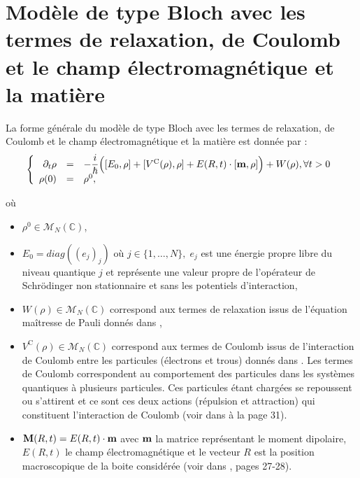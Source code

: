 \documentclass[a4paper,12pt]{article} %
\begin{document}

\tableofcontents

\bigskip



\section{Modèle de type Bloch avec les termes de relaxation, de Coulomb et le champ électromagnétique et la matière}

La forme générale du modèle de type Bloch avec les termes de relaxation, de Coulomb et le champ électromagnétique et la matière est donnée par :
\begin{equation}\label{modèle de base}
\left\{
   \begin{array}{rcl}
   
   \partial_{t}\rho & = & -\dfrac{i}{\hbar}\Big([E_{0},\rho]+[V^{\textrm{C}}(\rho),\rho]+E(R,t)\cdot[\textbf{\textrm{m}},\rho]\Big)+ W(\rho), \forall t>0 \\
   \rho(0)          & = & \rho^{0},
   
   \end{array}
 \right.
\end{equation}

où 
\begin{itemize}[label=$\centerdot$]
\item $ \rho^{0}\in \mathcal{M}_{N}(\mathbb{C}) $,
\item $ E_{0}= diag((e_{j})_{j}) $  où $j\in \{1,\ldots, N\}, \; e_{j}$ est une énergie propre libre du niveau quantique $j$ et représente une valeur propre de l'opérateur de Schrödinger non stationnaire et sans les potentiels d'interaction,
\item $ W(\rho)\in \mathcal{M}_{N}(\mathbb{C}) $ correspond aux termes de relaxation issus de l'équation maîtresse de Pauli donnés dans \cite{mareference2},
\item $ V^{\textrm{C}}(\rho)\in \mathcal{M}_{N}(\mathbb{C}) $ correspond aux termes de Coulomb issus de l'interaction de Coulomb entre les particules (électrons et trous) donnés dans \cite{mareference1}. Les termes de Coulomb correspondent au comportement des particules dans les systèmes quantiques à plusieurs particules. Ces particules étant chargées se repoussent ou s’attirent et ce sont ces deux actions (répulsion et attraction) qui constituent l’interaction de Coulomb (voir dans \cite{mareference1} à la page 31). 
\item $\textbf{\textrm{M}}(R,t)=E(R,t)\cdot \textbf{\textrm{m}} $ avec $ \textbf{\textrm{m}}$ la matrice représentant le moment dipolaire, $ E(R,t)$ le champ électromagnétique et le vecteur $ R $  est la position macroscopique de la boite considérée (voir dans \cite{mareference1}, pages 27-28).                         
 \end{itemize}
\end{document}
